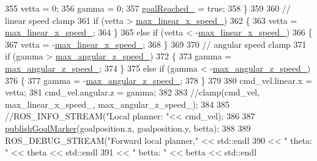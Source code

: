 \begin{DoxyCode}
{355         vetta = 0;
356         gamma = 0;
357         \hyperlink{classcl__move__base__z_1_1forward__local__planner_1_1ForwardLocalPlanner_a9d51ad6f0eb364ebd830526280bdf4fc}{goalReached\_} = \textcolor{keyword}{true};
358     \}
359 
360     \textcolor{comment}{// linear speed clamp}
361     \textcolor{keywordflow}{if} (vetta > \hyperlink{classcl__move__base__z_1_1forward__local__planner_1_1ForwardLocalPlanner_ab2e354dca208a2df60e905c9ee1fcd75}{max\_linear\_x\_speed\_})
362     \{
363         vetta = \hyperlink{classcl__move__base__z_1_1forward__local__planner_1_1ForwardLocalPlanner_ab2e354dca208a2df60e905c9ee1fcd75}{max\_linear\_x\_speed\_};
364     \}
365     \textcolor{keywordflow}{else} \textcolor{keywordflow}{if} (vetta < -\hyperlink{classcl__move__base__z_1_1forward__local__planner_1_1ForwardLocalPlanner_ab2e354dca208a2df60e905c9ee1fcd75}{max\_linear\_x\_speed\_})
366     \{
367         vetta = -\hyperlink{classcl__move__base__z_1_1forward__local__planner_1_1ForwardLocalPlanner_ab2e354dca208a2df60e905c9ee1fcd75}{max\_linear\_x\_speed\_};
368     \}
369 
370     \textcolor{comment}{// angular speed clamp}
371     \textcolor{keywordflow}{if} (gamma > \hyperlink{classcl__move__base__z_1_1forward__local__planner_1_1ForwardLocalPlanner_a198154e40443d46292d8eba1d81ad34f}{max\_angular\_z\_speed\_})
372     \{
373         gamma = \hyperlink{classcl__move__base__z_1_1forward__local__planner_1_1ForwardLocalPlanner_a198154e40443d46292d8eba1d81ad34f}{max\_angular\_z\_speed\_};
374     \}
375     \textcolor{keywordflow}{else} \textcolor{keywordflow}{if} (gamma < -\hyperlink{classcl__move__base__z_1_1forward__local__planner_1_1ForwardLocalPlanner_a198154e40443d46292d8eba1d81ad34f}{max\_angular\_z\_speed\_})
376     \{
377         gamma = -\hyperlink{classcl__move__base__z_1_1forward__local__planner_1_1ForwardLocalPlanner_a198154e40443d46292d8eba1d81ad34f}{max\_angular\_z\_speed\_};
378     \}
379 
380     cmd\_vel.linear.x = vetta;
381     cmd\_vel.angular.z = gamma;
382 
383     \textcolor{comment}{//clamp(cmd\_vel, max\_linear\_x\_speed\_, max\_angular\_z\_speed\_);}
384 
385     \textcolor{comment}{//ROS\_INFO\_STREAM("Local planner: "<< cmd\_vel);}
386 
387     \hyperlink{classcl__move__base__z_1_1forward__local__planner_1_1ForwardLocalPlanner_ae2ef5a1d00495eb7a6c22ec35ab8baf2}{publishGoalMarker}(goalposition.x, goalposition.y, betta);
388 
389     ROS\_DEBUG\_STREAM(\textcolor{stringliteral}{"Forward local planner,"} << std::endl
390                                               << \textcolor{stringliteral}{" theta: "} << theta << std::endl
391                                               << \textcolor{stringliteral}{" betta: "} << betta << std::endl
}
\end{DoxyCode}
